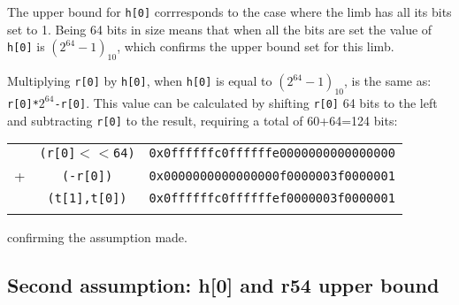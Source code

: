 \documentclass{article}
\begin{document}
The upper bound for \texttt{h[0]} corrresponds to the case where the limb has all its bits set to 1. Being 64 bits in size means that when all the bits are set 
the value of \texttt{h[0]} is $(2^{64}-1)_{10}$, which confirms the upper bound set for this limb.

Multiplying \texttt{r[0]} by \texttt{h[0]}, when \texttt{h[0]} is equal to $(2^{64}-1)_{10}$, is the same as: \texttt{r[0]*}$2^{64}$\texttt{-r[0]}. This value
can be calculated by shifting \texttt{r[0]} 64 bits to the left and subtracting \texttt{r[0]} to the result, requiring a total of 60+64=124 bits: 

\begin{tabular}{c c c}
\\
    &  \texttt{(r[0]$<<$64)}     &\texttt{0x0ffffffc0ffffffe0000000000000000} \\
+   &  \texttt{(-r[0])}          &\texttt{0x0000000000000000f0000003f0000001} \\
\hline
    &  \texttt{(t[1],t[0])}      &\texttt{0x0ffffffc0ffffffef0000003f0000001} \\
\\
\end{tabular}


confirming the assumption made.

\subsection{Second assumption: h[0] and r54 upper bound}
\end{document}
